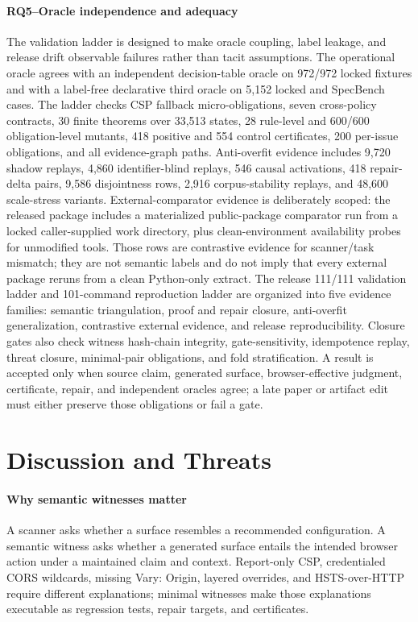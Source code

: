 \documentclass[10pt,conference]{IEEEtran}
\begin{document}
\paragraph{RQ5--Oracle independence and adequacy}
The validation ladder is designed to make oracle coupling, label leakage, and release drift observable failures rather than tacit assumptions. The operational oracle agrees with an independent decision-table oracle on 972/972 locked fixtures and with a label-free declarative third oracle on 5,152 locked and SpecBench cases. The ladder checks CSP fallback micro-obligations, seven cross-policy contracts, 30 finite theorems over 33,513 states, 28 rule-level and 600/600 obligation-level mutants, 418 positive and 554 control certificates, 200 per-issue obligations, and all evidence-graph paths. Anti-overfit evidence includes 9,720 shadow replays, 4,860 identifier-blind replays, 546 causal activations, 418 repair-delta pairs, 9,586 disjointness rows, 2,916 corpus-stability replays, and 48,600 scale-stress variants. External-comparator evidence is deliberately scoped: the released package includes a materialized public-package comparator run from a locked caller-supplied work directory, plus clean-environment availability probes for unmodified tools. Those rows are contrastive evidence for scanner/task mismatch; they are not semantic labels and do not imply that every external package reruns from a clean Python-only extract. The release 111/111 validation ladder and 101-command reproduction ladder are organized into five evidence families: semantic triangulation, proof and repair closure, anti-overfit generalization, contrastive external evidence, and release reproducibility. Closure gates also check witness hash-chain integrity, gate-sensitivity, idempotence replay, threat closure, minimal-pair obligations, and fold stratification. A result is accepted only when source claim, generated surface, browser-effective judgment, certificate, repair, and independent oracles agree; a late paper or artifact edit must either preserve those obligations or fail a gate.

\section{Discussion and Threats}

\paragraph{Why semantic witnesses matter}
A scanner asks whether a surface resembles a recommended configuration. A semantic witness asks whether a generated surface entails the intended browser action under a maintained claim and context. Report-only CSP, credentialed CORS wildcards, missing Vary: Origin, layered overrides, and HSTS-over-HTTP require different explanations; minimal witnesses make those explanations executable as regression tests, repair targets, and certificates.
\end{document}
